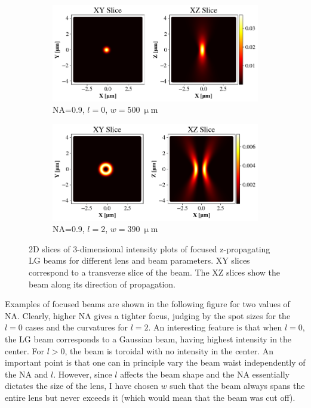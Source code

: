 \begin{figure}
    \begin{subfigure}[b]{0.49\textwidth}
        \includegraphics[width=\textwidth]{Figures/Efoc_NA9_l0.png}
        \caption{NA=0.9, \( l=0 \), \( w=500\ \mathrm{\upmu m} \)}
        \label{fig:c}
    \end{subfigure}
    \begin{subfigure}[b]{0.49\textwidth}
        \includegraphics[width=\textwidth]{Figures/Efoc_NA9_l2.png}
        \caption{NA=0.9, \( l=2 \), \( w=390\ \mathrm{\upmu m} \)}
        \label{fig:d}
    \end{subfigure}

    \caption{2D slices of 3-dimensional intensity plots of focused z-propagating LG beams for different lens and beam parameters. XY slices correspond to a transverse slice of the beam. The XZ slices show the beam along its direction of propagation.}
    \label{fig:Efoc}
\end{figure}

Examples of focused beams are shown in the following figure for two values of NA. Clearly, higher NA gives a tighter focus, judging by the spot sizes for the \( l=0 \) cases and the curvatures for \( l=2 \). 
An interesting feature is that when \( l=0 \), the LG beam corresponds to a Gaussian beam, having highest intensity in the center. For \( l > 0 \), the beam is toroidal with no intensity in the center. 
An important point is that one can in principle vary the beam waist independently of the NA and \( l \). However, since \( l \) affects the beam shape and the NA essentially dictates the size of the lens, I have chosen \( w \) such that the beam always spans the entire lens but never exceeds it (which would mean that the beam was cut off).

